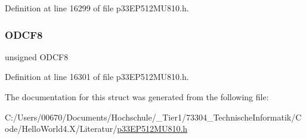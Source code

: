 Definition at line 16299 of file p33\+E\+P512\+M\+U810.\+h.

\mbox{\label{structtag_o_d_c_f_b_i_t_s_aa8e9d32dd3b14d6d2bc46845bd6e0f3b}} 
\subsubsection{\texorpdfstring{O\+D\+C\+F8}{ODCF8}}
{\footnotesize\ttfamily unsigned O\+D\+C\+F8}



Definition at line 16301 of file p33\+E\+P512\+M\+U810.\+h.



The documentation for this struct was generated from the following file\+:\begin{DoxyCompactItemize}
\item 
C\+:/\+Users/00670/\+Documents/\+Hochschule/\+\_\+\+Tier1/73304\+\_\+\+Technische\+Informatik/\+Code/\+Hello\+World4.\+X/\+Literatur/\hyperlink{p33_e_p512_m_u810_8h}{p33\+E\+P512\+M\+U810.\+h}\end{DoxyCompactItemize}
